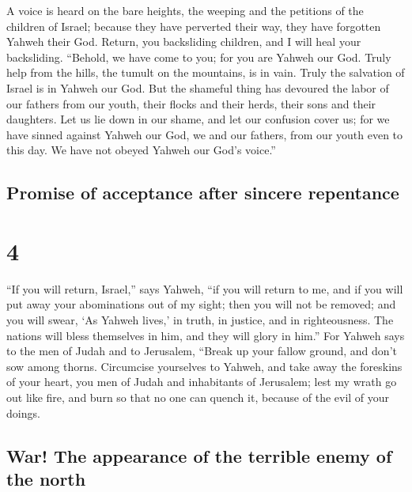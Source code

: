  A voice is heard on the bare heights, the weeping and
the petitions of the children of Israel; because they have perverted
their way, they have forgotten Yahweh their God.  Return,
you backsliding children, and I will heal your backsliding. ``Behold, we
have come to you; for you are Yahweh our God.  Truly help
from the hills, the tumult on the mountains, is in vain. Truly the
salvation of Israel is in Yahweh our God.  But the
shameful thing has devoured the labor of our fathers from our youth,
their flocks and their herds, their sons and their daughters.
 Let us lie down in our shame, and let our confusion
cover us; for we have sinned against Yahweh our God, we and our fathers,
from our youth even to this day. We have not obeyed Yahweh our God's
voice.''

\hypertarget{promise-of-acceptance-after-sincere-repentance}{%
\subsection{Promise of acceptance after sincere
repentance}\label{promise-of-acceptance-after-sincere-repentance}}

\hypertarget{section-3}{%
\section{4}\label{section-3}}

 ``If you will return, Israel,'' says Yahweh, ``if you
will return to me, and if you will put away your abominations out of my
sight; then you will not be removed;  and you will swear,
`As Yahweh lives,' in truth, in justice, and in righteousness. The
nations will bless themselves in him, and they will glory in him.''
 For Yahweh says to the men of Judah and to Jerusalem,
``Break up your fallow ground, and don't sow among thorns.
 Circumcise yourselves to Yahweh, and take away the
foreskins of your heart, you men of Judah and inhabitants of Jerusalem;
lest my wrath go out like fire, and burn so that no one can quench it,
because of the evil of your doings.

\hypertarget{war-the-appearance-of-the-terrible-enemy-of-the-north}{%
\subsection{War! The appearance of the terrible enemy of the
north}\label{war-the-appearance-of-the-terrible-enemy-of-the-north}}

